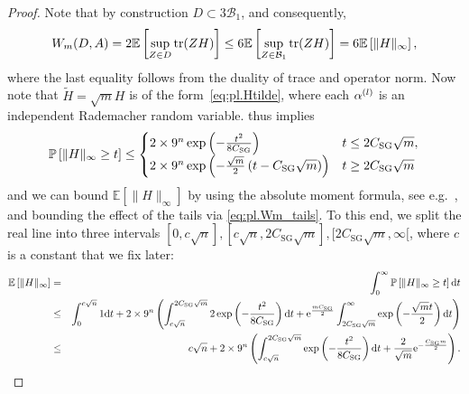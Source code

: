 \begin{proof}
  Note that by construction $D \subset 3 \mathcal{B}_1$, and consequently,
  \begin{align}
    W_m (D,  A) = 2 \mathbb{E} \left[ \sup_{ Z \in D} \operatorname{tr} ( Z  H) \right] \leq 6 \mathbb{E} \left[ \sup_{ Z \in \mathcal{B}_1} \operatorname{tr} ( Z  H) \right] = 6 \mathbb{E} \left[ \|  H \|_\infty  \right], \label{eq:pl.Wm_hoelder}
  \end{align}
  where the last equality follows from the duality of trace and operator norm.
  Now note that $\tilde{ H} = \sqrt{m}  H$ is of the form~\eqref{eq:pl.Htilde}, where each $\alpha^{(l)}$ is an independent Rademacher random variable.
   thus implies
  \begin{align}
    \mathbb{P} \left[\|  H \|_\infty \geq t \right]
    \leq
    \begin{cases}
     2 \times 9^n \exp \left( - \frac{t^2}{8 C_\mathrm{SG}} \right) & t \leq 2C_\mathrm{SG} \sqrt{m}, \\
    2 \times 9^n \exp \left( - \frac{\sqrt{m}}{2} \left( t - C_\mathrm{SG} \sqrt{m} \right) \right) & t \geq 2 C_\mathrm{SG} \sqrt{m}
    \end{cases}
    \label{eq:pl.Wm_tails}
  \end{align}
  and we can bound $\mathbb{E} \left[ \|  H \|_\infty \right]$ by using the absolute moment formula,
  see e.g.\ \cite[Propostion~7.1]{Foucart_2013_Mathematical}, and bounding the effect of the tails via \eqref{eq:pl.Wm_tails}.
  To this end, we split the real line into three intervals $[0, c \sqrt{n}], [c\sqrt{n}, 2 C_\mathrm{SG} \sqrt{m}], [2 C_\mathrm{SG} \sqrt{m},\infty[$, where $c$ is a constant that we fix later:
  \begin{align}
    \mathbb{E} \left[ \| H\|_\infty \right]
    &=& \int_0^\infty \Prob \left[ \| H\|_\infty \geq t \right] \mathrm{d}t \\
    &\leq& \int_0^{c \sqrt{n}} 1 \mathrm{d}t + 2 \times 9^n \left( \int_{c \sqrt{n}}^{2 C_\mathrm{SG} \sqrt{m}} 2 \exp \left( - \frac{t^2}{8 C_\mathrm{SG}} \right) \mathrm{d}t
     +  \mathrm{e}^{\frac{m C_\mathrm{SG}}{2}} \int_{2 C_\mathrm{SG} \sqrt{m}}^\infty \exp\left( - \frac{\sqrt{m}t}{2}  \right) \mathrm{d} t \right)\\
    &\leq & c \sqrt{n} + 2 \times 9^n \left( \int_{c \sqrt{n}}^{2 C_\mathrm{SG} \sqrt{m}}  \exp \left( - \frac{t^2}{8 C_\mathrm{SG}} \right) \mathrm{d}t + \frac{2}{\sqrt{m}} \mathrm{e}^{-\frac{C_\mathrm{SG} m}{2}}\right).

\end{align}
\end{proof}
